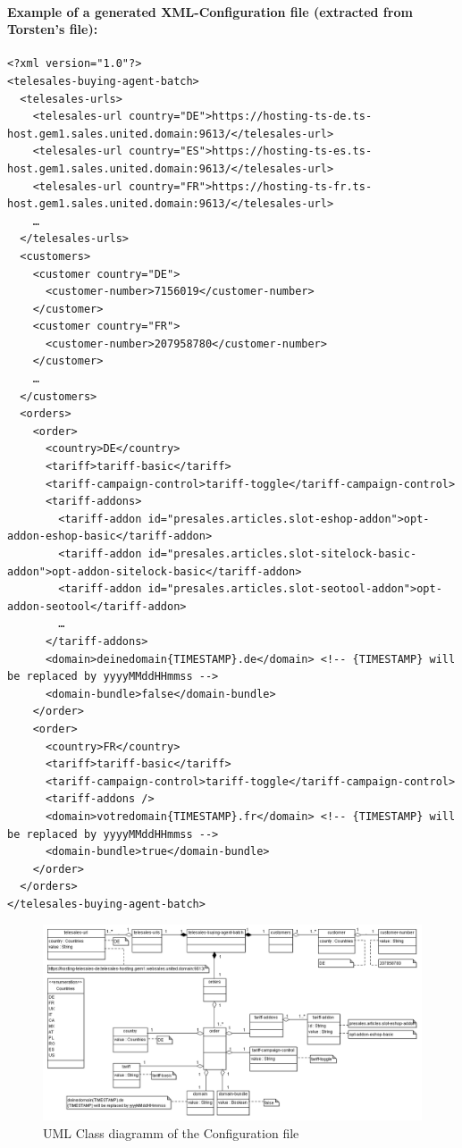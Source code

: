 \begin{landscape}
\paragraph{Example of a generated XML-Configuration file (extracted from Torsten's file):}
\begin{verbatim}
<?xml version="1.0"?>
<telesales-buying-agent-batch>
  <telesales-urls>
    <telesales-url country="DE">https://hosting-ts-de.ts-host.gem1.sales.united.domain:9613/</telesales-url>
    <telesales-url country="ES">https://hosting-ts-es.ts-host.gem1.sales.united.domain:9613/</telesales-url>
    <telesales-url country="FR">https://hosting-ts-fr.ts-host.gem1.sales.united.domain:9613/</telesales-url>
    …
  </telesales-urls>
  <customers>
    <customer country="DE">
      <customer-number>7156019</customer-number>
    </customer>
    <customer country="FR">
      <customer-number>207958780</customer-number>
    </customer>
    …
  </customers>
  <orders>
    <order>
      <country>DE</country>
      <tariff>tariff-basic</tariff>
      <tariff-campaign-control>tariff-toggle</tariff-campaign-control>
      <tariff-addons>
        <tariff-addon id="presales.articles.slot-eshop-addon">opt-addon-eshop-basic</tariff-addon>
        <tariff-addon id="presales.articles.slot-sitelock-basic-addon">opt-addon-sitelock-basic</tariff-addon>
        <tariff-addon id="presales.articles.slot-seotool-addon">opt-addon-seotool</tariff-addon>
        …
      </tariff-addons>
      <domain>deinedomain{TIMESTAMP}.de</domain> <!-- {TIMESTAMP} will be replaced by yyyyMMddHHmmss -->
      <domain-bundle>false</domain-bundle>
    </order>
    <order>
      <country>FR</country>
      <tariff>tariff-basic</tariff>
      <tariff-campaign-control>tariff-toggle</tariff-campaign-control>
      <tariff-addons />
      <domain>votredomain{TIMESTAMP}.fr</domain> <!-- {TIMESTAMP} will be replaced by yyyyMMddHHmmss -->
      <domain-bundle>true</domain-bundle>
    </order>
  </orders>
</telesales-buying-agent-batch>
\end{verbatim}

\begin{figure}[h!]
\centering
\includegraphics[width=1.1\textwidth]{d_class_batch.png}
\caption{UML Class diagramm of the Configuration file}
\end{figure}

\end{landscape}

